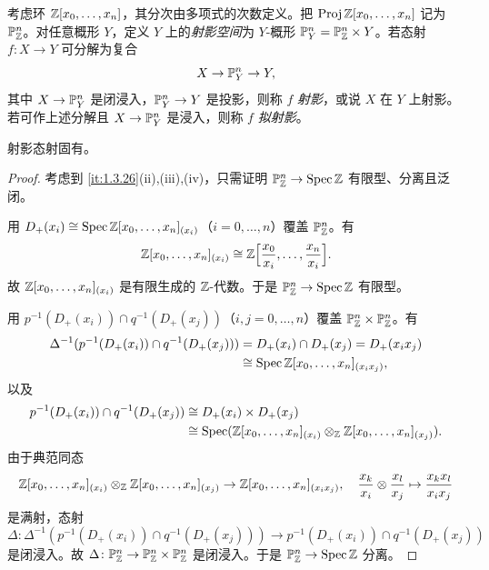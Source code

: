 考虑环 $\mathbb{Z}[x_0,\dots,x_n]$，其分次由多项式的次数定义。把 $\operatorname{Proj} \mathbb{Z}[x_0,\dots,x_n]$ 记为 $\mathbb{P}^n_{\mathbb{Z}}$。对任意概形 $Y$，定义 $Y$ 上的\emph{射影空间}为 $Y$-概形 $\mathbb{P}^n_Y=\mathbb{P}^n_{\mathbb{Z}}\times Y$。若态射 $f\colon X\to Y$ 可分解为复合
\[
X\to \mathbb{P}^n_Y\to Y,
\]
其中 $X\to \mathbb{P}^n_Y$ 是闭浸入，$\mathbb{P}^n_Y\to Y$ 是投影，则称 $f$ \emph{射影}，或说 $X$ 在 $Y$ 上射影。若可作上述分解且 $X\to \mathbb{P}^n_Y$ 是浸入，则称 $f$ \emph{拟射影}。

\begin{proposition}\label{it:1.3.27}
射影态射固有。
\end{proposition}

\begin{proof}
考虑到 \ref{it:1.3.26}(ii),(iii),(iv)，只需证明 $\mathbb{P}^n_{\mathbb{Z}}\to \operatorname{Spec}\mathbb{Z}$ 有限型、分离且泛闭。

用 $D_+(x_i)\cong \operatorname{Spec} \mathbb{Z}[x_0,\dots,x_n]_{(x_i)}$（$i=0,\dots,n$）覆盖 $\mathbb{P}^n_{\mathbb{Z}}$。有
\[
\mathbb{Z}[x_0,\dots,x_n]_{(x_i)}\cong \mathbb{Z}\Bigl[\frac{x_0}{x_i},\dots,\frac{x_n}{x_i}\Bigr].
\]
故 $\mathbb{Z}[x_0,\dots,x_n]_{(x_i)}$ 是有限生成的 $\mathbb{Z}$-代数。于是 $\mathbb{P}^n_{\mathbb{Z}}\to \operatorname{Spec}\mathbb{Z}$ 有限型。

用 $p^{-1}(D_+(x_i))\cap q^{-1}(D_+(x_j))$（$i,j=0,\dots,n$）覆盖 $\mathbb{P}^n_{\mathbb{Z}}\times\mathbb{P}^n_{\mathbb{Z}}$。有
\[
\begin{aligned}
\Delta^{-1}(p^{-1}(D_+(x_i))\cap q^{-1}(D_+(x_j)))
&=D_+(x_i)\cap D_+(x_j)=D_+(x_ix_j)\\
&\cong \operatorname{Spec} \mathbb{Z}[x_0,\dots,x_n]_{(x_ix_j)},
\end{aligned}
\]
以及
\[
\begin{aligned}
p^{-1}(D_+(x_i))\cap q^{-1}(D_+(x_j))
&\cong D_+(x_i)\times D_+(x_j)\\
&\cong \operatorname{Spec}(\mathbb{Z}[x_0,\dots,x_n]_{(x_i)}\otimes_{\mathbb{Z}}\mathbb{Z}[x_0,\dots,x_n]_{(x_j)}).
\end{aligned}
\]
由于典范同态
\[
\mathbb{Z}[x_0,\dots,x_n]_{(x_i)}\otimes_{\mathbb{Z}}\mathbb{Z}[x_0,\dots,x_n]_{(x_j)}\to \mathbb{Z}[x_0,\dots,x_n]_{(x_ix_j)},\quad
\frac{x_k}{x_i}\otimes\frac{x_l}{x_j}\mapsto \frac{x_kx_l}{x_ix_j}
\]
是满射，态射
\[
\Delta\colon \Delta^{-1}(p^{-1}(D_+(x_i))\cap q^{-1}(D_+(x_j)))\to p^{-1}(D_+(x_i))\cap q^{-1}(D_+(x_j))
\]
是闭浸入。故 $\Delta\colon \mathbb{P}^n_{\mathbb{Z}}\to \mathbb{P}^n_{\mathbb{Z}}\times\mathbb{P}^n_{\mathbb{Z}}$ 是闭浸入。于是 $\mathbb{P}^n_{\mathbb{Z}}\to \operatorname{Spec}\mathbb{Z}$ 分离。


\end{proof}
